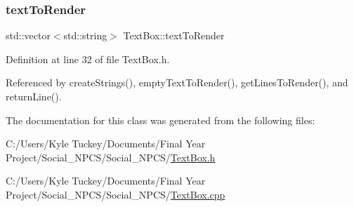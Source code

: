 \subsubsection{\texorpdfstring{text\+To\+Render}{textToRender}}
{\footnotesize\ttfamily std\+::vector$<$std\+::string$>$ Text\+Box\+::text\+To\+Render\hspace{0.3cm}{\ttfamily [private]}}



Definition at line 32 of file Text\+Box.\+h.



Referenced by create\+Strings(), empty\+Text\+To\+Render(), get\+Lines\+To\+Render(), and return\+Line().



The documentation for this class was generated from the following files\+:\begin{DoxyCompactItemize}
\item 
C\+:/\+Users/\+Kyle Tuckey/\+Documents/\+Final Year Project/\+Social\+\_\+\+N\+P\+C\+S/\+Social\+\_\+\+N\+P\+C\+S/\hyperlink{_text_box_8h}{Text\+Box.\+h}\item 
C\+:/\+Users/\+Kyle Tuckey/\+Documents/\+Final Year Project/\+Social\+\_\+\+N\+P\+C\+S/\+Social\+\_\+\+N\+P\+C\+S/\hyperlink{_text_box_8cpp}{Text\+Box.\+cpp}\end{DoxyCompactItemize}

